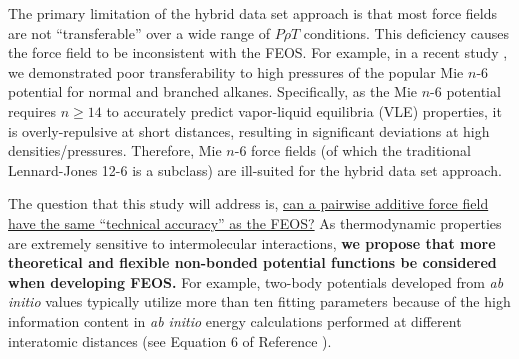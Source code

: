 \documentclass[12pt,a4paper]{article}
\begin{document}
 
 

The primary limitation of the hybrid data set approach is that most force fields are not ``transferable'' over a wide range of $P \rho T$ conditions. This deficiency causes the force field to be inconsistent with the FEOS. For example, in a recent study \cite{Messerly2018_2}, we demonstrated poor transferability to high pressures of the popular Mie $n$-6 potential for normal and branched alkanes. Specifically, as the Mie $n$-6 potential requires $n \ge 14$ to accurately predict vapor-liquid equilibria (VLE) properties, it is overly-repulsive at short distances, resulting in significant deviations at high densities/pressures. Therefore, Mie $n$-6 force fields (of which the traditional Lennard-Jones 12-6 is a subclass) are ill-suited for the hybrid data set approach.

The question that this study will address is, \ul{can a pairwise additive force field have the same ``technical accuracy'' as the FEOS?} As thermodynamic properties are extremely sensitive to  intermolecular interactions, \textbf{we propose that more theoretical and flexible non-bonded potential functions be considered when developing FEOS.} For example, two-body potentials developed from \textit{ab initio} values typically utilize more than ten fitting parameters because of the high information content in \textit{ab initio} energy calculations performed at different interatomic distances (see Equation 6 of Reference ). 
\end{document}
